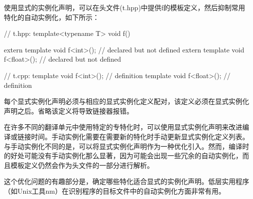 使用显式的实例化声明，可以在头文件(t.hpp)中提供f的模板定义，然后抑制常用特化的自动实例化，如下所示：

\begin{cpp}
// t.hpp:
template<typename T> void f()
{ }

extern template void f<int>(); // declared but not defined
extern template void f<float>(); // declared but not defined

// t.cpp:
template void f<int>(); // definition
template void f<float>(); // definition
\end{cpp}

每个显式实例化声明必须与相应的显式实例化定义配对，该定义必须在显式实例化声明之后。省略该定义将导致链接器报错。

在许多不同的翻译单元中使用特定的专特化时，可以使用显式实例化声明来改进编译或链接时间。手动实例化需要在需要新的特化时手动更新显式实例化定义列表。与手动实例化不同的是，可以将显式实例化声明作为一种优化引入。然而，编译时的好处可能没有手动实例化那么显著，因为可能会出现一些冗余的自动实例化，而且模板定义仍然会作为头文件的一部分进行解析。

\begin{notice}
这个优化问题的有趣部分是，确定哪些特化适合显式的实例化声明。低层实用程序（如Unix工具nm）在识别程序的目标文件中的自动实例化方面非常有用。
\end{notice}


















